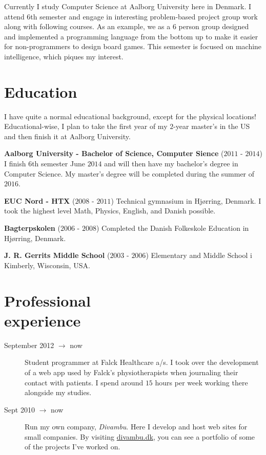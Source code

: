 \documentclass[margin,line,a4paper]{resume}
\begin{document}
\begin{resume}
    Currently I study Computer Science at Aalborg University here
    in Denmark. I attend 6th semester and engage in interesting
    problem-based project group work along with following courses.
    As an example, we as a 6 person group designed and implemented a
    programming language from the bottom up to make it easier for
    non-programmers to design board games. This semester is focused on
    machine intelligence, which piques my interest.

    \section{\mysidestyle Education}
    I have quite a normal educational background, except for the
    physical locations! Educational-wise, I plan to take the first year of
    my $2$-year master's in the US and then finish it at Aalborg University.

    \textbf{Aalborg University - Bachelor of Science, Computer Sience}
    ($2011$ - $2014$) I finish $6$th semester June $2014$ and will then
    have my bachelor's degree in Computer Science. My master's degree
    will be completed during the summer of $2016$.
      
    \textbf{EUC Nord - HTX} ($2008$ - $2011$) Technical gymnasium in
    Hjørring, Denmark. I took the highest level Math, Physics, English,
    and Danish possible.
    
    \textbf{Bagterpskolen} ($2006$ - $2008$) Completed the Danish
    Folkeskole Education in Hjørring, Denmark.

    \textbf{J. R. Gerrits Middle School} ($2003$ - $2006$) Elementary and 
    Middle School i Kimberly, Wisconsin, USA.

\section{\mysidestyle Professional\\experience}\vspace{1mm}
\begin{description}

  \item[September 2012 $\rightarrow$ now] Student programmer at Falck
  Healthcare a/s. I took over the development of a web app used by
  Falck's physiotherapists when journaling their contact with patients.
  I spend around $15$ hours per week working there alongside my studies.

  \item[Sept 2010 $\rightarrow$ now] Run my own company,
    \emph{Divambu}. Here I develop and host web sites for small companies.
    By visiting \url{divambu.dk}, you can see a portfolio of some of the
    projects I've worked on.


\end{description}
\end{resume}
\end{document}
